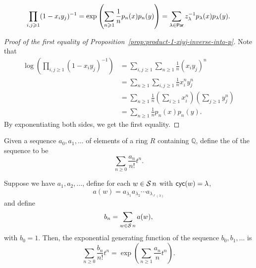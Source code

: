 \begin{proposition} \label{prop:product-1-xiyj-inverse-into-p}
	\begin{equation}
		\prod_{i, j \geqslant 1} (1 - x_iy_j)^{-1}
		= \exp\left( \sum_{n \geqslant 1} \frac{1}{n} p_n(x) p_n(y) \right)
		= \sum_{\lambda \in \operatorname{\mathsf{Par}}} z_\lambda^{-1} p_\lambda(x) p_\lambda(y).
	\end{equation}
\end{proposition}

\begin{proof}[Proof of the first equality of Proposition~\ref{prop:product-1-xiyj-inverse-into-p}]
	Note that
	\begin{align}
		\log\left(
			\prod_{i, j \geq 1} (1 - x_iy_j)^{-1}
		\right)
		&= \sum_{i, j \geq 1} \sum_{n \geq 1} \frac{1}{n} (x_iy_j)^n \\
		&= \sum_{n \geq 1} \sum_{i, j \geq 1} \frac{1}{n} x_i^n y_j^n \\
		&= \sum_{n \geq 1} \frac{1}{n} \left(\sum_{i \geq 1} x_i^n\right) \left(\sum_{j \geq 1} y_j^n\right) \\
		&= \sum_{n \geq 1} \frac{1}{n} p_n(x) p_n(y).
	\end{align}
	By exponentiating both sides, we get the first equality.
\end{proof}

Given a sequence \(a_0, a_1, \ldots\) of elements of a ring \(R\) containing \(\mathbb{Q}\), define the  of the sequence to be
\begin{equation}
	\sum_{n \geq 0} \frac{a_n}{n!} t^n.
\end{equation}

\begin{fact} \label{fact:egf-cyc-prod}
	Suppose we have \(a_1, a_2, \ldots\), define for each \(w \in \operatorname{\mathcal{S}}{n}\) with \(\operatorname{\mathsf{cyc}}(w) = \lambda\),
	\begin{equation}
		a(w) = a_{\lambda_1}a_{\lambda_2}\cdots a_{\lambda_{\ell(\lambda)}}
	\end{equation}
	and define 
	\begin{equation}
		b_n = \sum_{w \in \operatorname{\mathcal{S}}{n}} a(w),
	\end{equation}
	with \(b_0 = 1\).
	Then, the exponential generating function of the sequence \(b_0, b_1, \ldots\) is
	\begin{equation}
		\sum_{n \geq 0} \frac{b_n}{n!} t^n
		=
		\exp\left( \sum_{n \geq 1} \frac{a_n}{n} t^n \right).
	\end{equation}
\end{fact}

